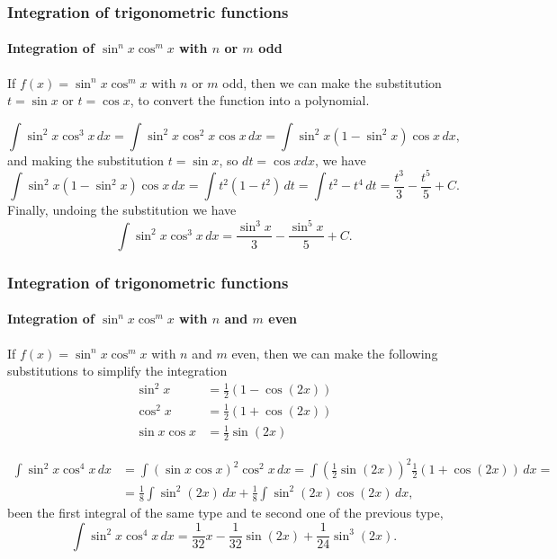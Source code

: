\begin{frame}
\frametitle{Integration of trigonometric functions}
\framesubtitle{Integration of $\sin^n x\cos^m x$ with $n$ or $m$ odd}
If $f(x)=\sin^n x\cos^m x$ with $n$ or $m$ odd, then we can make the substitution $t=\sin x$ or
$t=\cos x$, to convert the function into a polynomial.

\[
\int \sin^2 x\cos^3 x\, dx = \int \sin^2 x\cos^2 x\cos x\, dx = \int \sin^2 x(1-\sin^2 x)\cos x\, dx,
\]
and making the substitution $t=\sin x$, so $dt = \cos x dx$, we have
\[
\int \sin^2 x(1-\sin^2 x)\cos x\, dx = \int t^2(1-t^2)\, dt = \int t^2-t^4 \, dt = \frac{t^3}{3}-\frac{t^5}{5}+C.
\]
Finally, undoing the substitution we have
\[
\int \sin^2 x\cos^3 x\, dx = \frac{\sin^3 x}{3}-\frac{\sin^5 x}{5}+C.
\]
\end{frame}


\begin{frame}
\frametitle{Integration of trigonometric functions}
\framesubtitle{Integration of $\sin^n x\cos^m x$ with $n$ and $m$ even}
If $f(x)=\sin^n x\cos^m x$ with $n$ and $m$ even, then we can make the following substitutions to simplify the integration 
\begin{align*}
\sin^2 x &= \frac{1}{2}(1-\cos(2x))\\
\cos^2 x &= \frac{1}{2}(1+\cos(2x))\\
\sin x\cos x &= \frac{1}{2}\sin(2x)
\end{align*}

\begin{align*}
\int \sin^2 x\cos^4 x\, dx &= \int (\sin x\cos x)^2\cos^2 x\, dx = \int \left(\frac{1}{2}\sin(2x)\right)^2\frac{1}{2}(1+\cos(2x))\,dx =\\
&= \frac{1}{8}\int \sin^2(2x)\,dx+\frac{1}{8}\int \sin^2(2x) \cos(2x)\,dx,
\end{align*}
been the first integral of the same type and te second one of the previous type,
\[
\int \sin^2 x\cos^4 x\, dx = \frac{1}{32}x-\frac{1}{32}\sin(2x)+\frac{1}{24}\sin^3(2x).
\] 
\end{frame}


